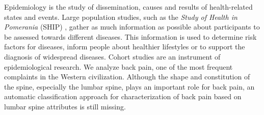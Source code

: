 \documentclass[a4paper,twoside]{style/article}
\begin{document}
\noindent Epidemiology is the study of dissemination, causes and results of health-related states and events.
Large population studies, such as the \emph{Study of Health in Pomerania} (SHIP) \cite{SHIP}, gather as much information as possible about participants to be assessed towards different diseases.
This information is used to determine risk factors for diseases, inform people about healthier lifestyles or to support the diagnosis of widespread diseases.
Cohort studies are an instrument of epidemiological research.
We analyze back pain, one of the most frequent complaints in the Western civilization. %
Although the shape and constitution of the spine, especially the lumbar spine, plays an important role for back pain, an automatic classification approach for characterization of back pain based on lumbar spine attributes is still missing.
\end{document}
